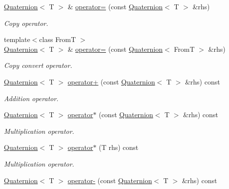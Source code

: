 \begin{DoxyCompactItemize}
\hyperlink{class_quaternion}{Quaternion}$<$ T $>$ \& \hyperlink{class_quaternion_ac76403b6bd79b91d21f8d17f3ac938bd}{operator=} (const \hyperlink{class_quaternion}{Quaternion}$<$ T $>$ \&rhs)
\begin{DoxyCompactList}\small\item\em Copy operator. \item\end{DoxyCompactList}\item 
{\footnotesize template$<$class FromT $>$ }\\\hyperlink{class_quaternion}{Quaternion}$<$ T $>$ \& \hyperlink{class_quaternion_ae61051568c9fb1742cb2dc9ad34132c1}{operator=} (const \hyperlink{class_quaternion}{Quaternion}$<$ FromT $>$ \&rhs)
\begin{DoxyCompactList}\small\item\em Copy convert operator. \item\end{DoxyCompactList}\item 
\hyperlink{class_quaternion}{Quaternion}$<$ T $>$ \hyperlink{class_quaternion_a006d553d3e85f86a6426aee06b52e3ac}{operator+} (const \hyperlink{class_quaternion}{Quaternion}$<$ T $>$ \&rhs) const 
\begin{DoxyCompactList}\small\item\em Addition operator. \item\end{DoxyCompactList}\item 
\hyperlink{class_quaternion}{Quaternion}$<$ T $>$ \hyperlink{class_quaternion_ab5b6d22e938709b43398f0bde1a056c8}{operator$\ast$} (const \hyperlink{class_quaternion}{Quaternion}$<$ T $>$ \&rhs) const 
\begin{DoxyCompactList}\small\item\em Multiplication operator. \item\end{DoxyCompactList}\item 
\hyperlink{class_quaternion}{Quaternion}$<$ T $>$ \hyperlink{class_quaternion_ad553f18f44e0466a0f68d60085ba09f7}{operator$\ast$} (T rhs) const 
\begin{DoxyCompactList}\small\item\em Multiplication operator. \item\end{DoxyCompactList}\item 
\hyperlink{class_quaternion}{Quaternion}$<$ T $>$ \hyperlink{class_quaternion_af1dcfe83f758752458d329fa3367b9bd}{operator-\/} (const \hyperlink{class_quaternion}{Quaternion}$<$ T $>$ \&rhs) const 

\end{DoxyCompactItemize}
